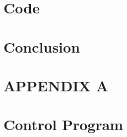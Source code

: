 \documentclass{article}
\begin{document}


\section{Code}
\label{sec:code}

\section{Conclusion}
\label{sec:conclusion}

%
%
 \newpage
\onecolumn
\appendix
\setcounter{table}{0}
\setcounter{figure}{0}
\setcounter{subsection}{0}
\makeatletter \renewcommand{\thefigure}{A.\@arabic\c@figure} \renewcommand{\thetable}{A.\@arabic\c@table} \renewcommand{\thesection}{A.\@arabic\c@section} \makeatother
\section*{APPENDIX A}

\section{Control Program}
%
 
\end{document}
